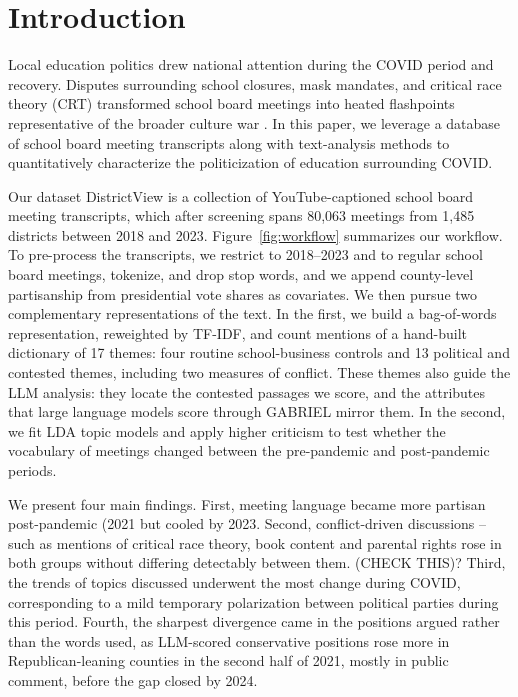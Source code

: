 \documentclass[12pt]{article}
\begin{document}
\section{Introduction}\label{sec:intro}
Local education politics drew
national attention during the COVID period and recovery. Disputes surrounding school closures, mask mandates, and critical race theory (CRT) transformed school board meetings into heated flashpoints representative of the broader culture war
\citep{onpoint_school_boards_2021,cnn_school_boards_2021,pollock_conflict_2022}. In this paper, we leverage a database of school board meeting transcripts along
with text-analysis methods to quantitatively characterize the politicization of
education surrounding COVID. 

Our dataset DistrictView
\citep{districtview_2026,holman_et_al_2026} is a collection of YouTube-captioned
school board meeting transcripts, which after screening spans 80,063 meetings from
1,485 districts between 2018 and 2023. Figure~\ref{fig:workflow} summarizes our
workflow. To pre-process the transcripts, we restrict to 2018--2023 and to regular
school board meetings, tokenize, and drop stop words, and we append county-level
partisanship from presidential vote shares as covariates. We then pursue two
complementary representations of the text. In the first, we build a bag-of-words
representation, reweighted by TF-IDF, and count mentions of a hand-built dictionary
of 17 themes: four routine school-business controls and 13 political and contested
themes, including two measures of conflict. These themes also guide the LLM
analysis: they locate the contested passages we score, and the attributes that large
language models score through GABRIEL \citep{gabriel} mirror them. In the second, we fit LDA topic models and apply higher criticism
to test whether the vocabulary of meetings changed between the pre-pandemic and
post-pandemic periods.

We present four main findings. First, meeting language
became more partisan post-pandemic (2021 but cooled by 2023. Second, conflict-driven discussions -- such as mentions of critical race theory, book content and
parental rights rose in both groups without differing detectably between them. (CHECK THIS)? 
Third, the trends of topics discussed underwent the most change during COVID, corresponding to a mild temporary polarization between political parties during this period.
Fourth, the sharpest divergence came in the positions argued rather than the words used, as LLM-scored conservative positions rose more in Republican-leaning counties in the second half of 2021, mostly in public comment, before the gap closed by 2024.
\end{document}
